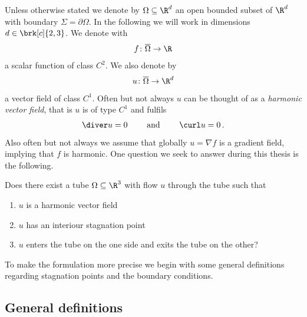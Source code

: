 Unless otherwise stated we denote by $\Omega\subseteq\R^d$ an open bounded subset of $\R^d$ with boundary $\Sigma=\partial\Omega$.
In the following we will work in dimensions $d\in\brk[c]{2,3}$.
We denote with
\begin{align*}
  f\colon\overline{\Omega}\to\R
\end{align*}
a scalar function of class $C^2$.
We also denote by
\begin{align*}
  u\colon\overline{\Omega}\to\R^d
\end{align*}
a vector field of class $C^1$.
Often but not always $u$ can be thought of as 
a \emph{harmonic vector field}, that is $u$ is of type $C^1$ and fulfils
\begin{align*}
  \diver u=0 \qquad \text{ and }\qquad \curl u=0\,.
\end{align*}
Also often but not always we assume that globally $u=\nabla f$ is a gradient field, implying that $f$ is harmonic.
One question we seek to answer during this thesis is the following.
\begin{question}\label{qu:flowthroughStagnationPoint}
  Does there exist a tube $\Omega\subseteq\R^3$ with flow $u$ through the tube such that
  \begin{enumerate}
    \item $u$ is a harmonic vector field
    \item $u$ has an interiour stagnation point
    \item $u$ enters the tube on the one side and exits the tube on the other?
  \end{enumerate}
\end{question}
To make the formulation more precise we begin with some general definitions regarding stagnation points and the boundary conditions.

\subsection{General definitions}

